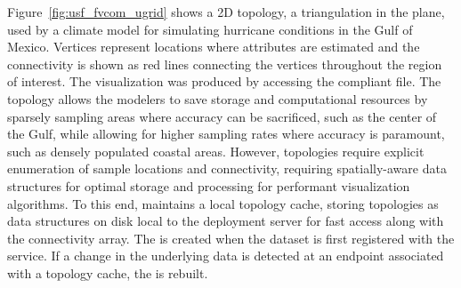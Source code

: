 Figure~\ref{fig:usf_fvcom_ugrid} shows a \ugrid{} 2D topology, a
triangulation in the plane, used by a climate model for simulating
hurricane conditions in the Gulf of Mexico. Vertices represent
locations where attributes are estimated and the connectivity is shown
as red lines connecting the vertices throughout the region of
interest. The visualization was produced by accessing the \cfugrid{}
compliant \ncml{} file. The \ugrid{} topology allows the modelers to
save storage and computational resources by sparsely sampling areas
where accuracy can be sacrificed, such as the center of the Gulf,
while allowing for higher sampling rates where accuracy is paramount,
such as densely populated coastal areas. However, \ugrid{} topologies
require explicit enumeration of sample locations and connectivity,
requiring spatially-aware data structures for optimal storage and
processing for performant visualization algorithms. To this end,
\sciwms{} maintains a local topology cache, storing \ugrid{} topologies
as \rtree{}~\cite{Guttman84} data structures on disk local to the
deployment server for fast access along with the connectivity
array. The \rtree{} is created when the dataset is first registered
with the \sciwms{} service. If a change in the underlying data is
detected at an endpoint associated with a topology cache, the \rtree{}
is rebuilt.
